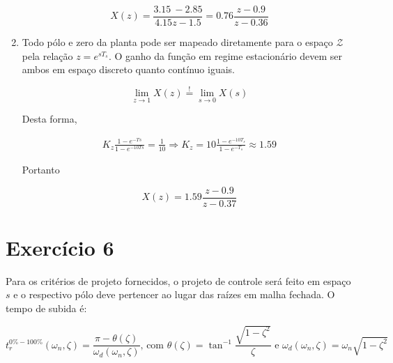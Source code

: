 \documentclass[twoside, fleqn]{article}
\begin{document}
\begin{enumerate}
            \begin{equation}
                X(z) = \frac{3.15\ - 2.85}{4.15z - 1.5} = 0.76 \frac{z - 0.9}{z - 0.36}
            \end{equation}
        
        \item %
        
        Todo pólo e zero da planta pode ser mapeado diretamente para o espaço $\mathcal{Z}$ pela relação $z = e^{s T_s}$. O ganho da função em regime estacionário devem ser ambos em espaço discreto quanto contínuo iguais.
        
            \begin{equation}
                \lim\limits_{z \rightarrow 1} X(z) \stackrel{!}{=} \lim\limits_{s \rightarrow 0} X(s) 
            \end{equation}
        
        Desta forma,
        
            \begin{equation*}
                \begin{split}
                    K_z \frac{1 - e^{-Ts}}{1 - e^{-10Ts}} = \frac{1}{10} \Rightarrow K_z = 10 \frac{1 - e^{-10T_s}}{1 - e^{-T_s}} \approx 1.59
                \end{split}
            \end{equation*}
            
        Portanto
        
            \begin{equation}
                X(z) = 1.59 \frac{z - 0.9}{z - 0.37}
            \end{equation}
        
    \end{enumerate}

\section*{Exercício 6} \label{sec:ex6}

    Para os critérios de projeto fornecidos, o projeto de controle será feito em espaço $s$ e o respectivo pólo deve pertencer ao lugar das raízes em malha fechada. O tempo de subida é:
    
        \begin{equation}
            t^{0\% - 100\%}_{r}(\omega_n, \zeta) = \frac{\pi - \theta(\zeta)}{\omega_d(\omega_n, \zeta)} \mbox{, com } \theta(\zeta) = \tan^{-1}\frac{\sqrt{1 - \zeta^2}}{\zeta} \mbox{ e } \omega_d(\omega_n, \zeta) = \omega_n \sqrt{1-\zeta^2}
            \label{eq:tempo_de_subida}
        \end{equation}
    
\end{document}
